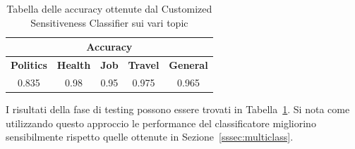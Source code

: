 \begin{table}[h!t]
\centering

\begin{tabular}{|c|c|c|c|c|}
\hline
\multicolumn{5}{|c|}{\textbf{Accuracy}} \\ \hline
\textbf{Politics} & \textbf{Health} & \textbf{Job} & \textbf{Travel} & \textbf{General} \\ \hline
0.835 & 0.98 & 0.95 & 0.975 & 0.965 \\ \hline
\end{tabular}
\caption{Tabella delle accuracy ottenute dal Customized Sensitiveness Classifier sui vari topic}
\label{tbl:testing_Customized}
\end{table}
\FloatBarrier
I risultati della fase di testing possono essere trovati in Tabella~\ref{tbl:testing_Customized}. Si nota come utilizzando questo approccio le performance del classificatore migliorino sensibilmente rispetto quelle ottenute in Sezione~\ref{sssec:multiclass}.
